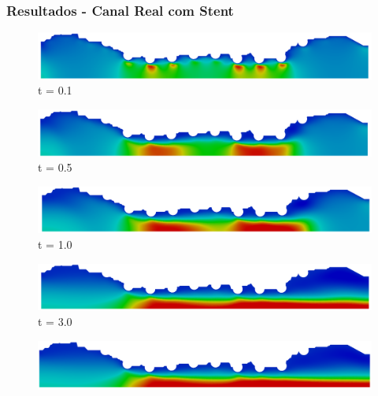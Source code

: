 \begin{frame}
 \frametitle{\Large Resultados - Canal Real com Stent}
\begin{figure}
     \begin{minipage}{.50\linewidth}
      \centering
      \includegraphics[scale=0.08]{images/vel_RealStrut200.png}\\
      \scriptsize t = 0.1
     \end{minipage}%
     \begin{minipage}{.50\linewidth}
      \centering
      \includegraphics[scale=0.08]{images/vel_RealStrut1000.png}\\
      \scriptsize t = 0.5
     \end{minipage}
     \begin{minipage}{.50\linewidth}
     \medskip
      \centering
      \includegraphics[scale=0.08]{images/vel_RealStrut2000.png}\\
      \scriptsize t = 1.0
     \end{minipage}%
     \begin{minipage}{.50\linewidth}
     \medskip
      \centering
      \includegraphics[scale=0.08]{images/vel_RealStrut6000.png}\\
      \scriptsize t = 3.0
     \end{minipage}
     \begin{minipage}{.50\linewidth}
      \centering
      \includegraphics[scale=0.08]{images/vel_RealStrut8000.png}\\

\end{minipage}
\end{figure}
\end{frame}
